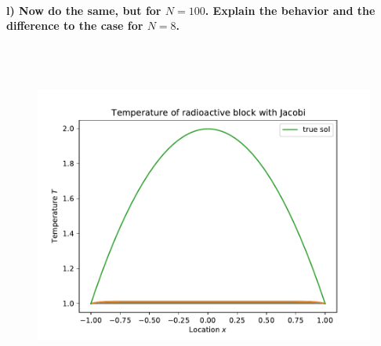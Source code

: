 \paragraph{
    l) Now do the same, but for $N=100$. Explain the behavior and the
    difference to the case for $N=8$.
} \ \\
    \\
    \begin{figure}[h!]
        \centering
        \includegraphics[width=.7\textwidth]{../figures/Aufg1l.pdf}
    \end{figure} \ \\ 
    
